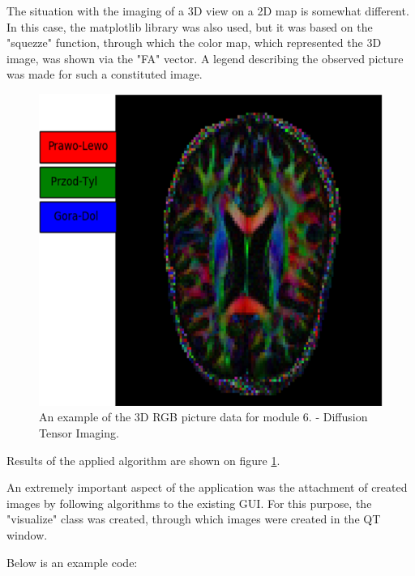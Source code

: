 The situation with the imaging of a 3D view on a 2D map is somewhat different. In this case, the matplotlib library was also used, but it was based on the "squezze" function, through which the color map, which represented the 3D image, was shown via the "FA" vector. A legend describing the observed picture was made for such a constituted image.


\begin{figure}
\centering
\includegraphics[scale=0.7]{figures/vis3}

\caption[Threads scheme]{\label{Fig:vis3}An example of the 3D RGB picture data for module 6. - Diffusion Tensor Imaging.}
\end{figure}


Results of the applied algorithm are shown on figure \ref{Fig:vis3}. 

An extremely important aspect of the application was the attachment of created images by following algorithms to the existing GUI. For this purpose, the "visualize" class was created, through which images were created in the QT window.

Below is an example code:

